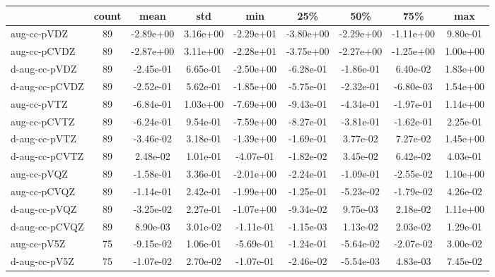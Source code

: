 \begin{tabular}{lSSSSSSSS}
\toprule
{} & {count} & {mean} & {std} & {min} & {25\%} & {50\%} & {75\%} & {max} \\
\midrule
aug-cc-pVDZ & 89 & -2.89e+00 & 3.16e+00 & -2.29e+01 & -3.80e+00 & -2.29e+00 & -1.11e+00 & 9.80e-01 \\
aug-cc-pCVDZ & 89 & -2.87e+00 & 3.11e+00 & -2.28e+01 & -3.75e+00 & -2.27e+00 & -1.25e+00 & 1.00e+00 \\
d-aug-cc-pVDZ & 89 & -2.45e-01 & 6.65e-01 & -2.50e+00 & -6.28e-01 & -1.86e-01 & 6.40e-02 & 1.83e+00 \\
d-aug-cc-pCVDZ & 89 & -2.52e-01 & 5.62e-01 & -1.85e+00 & -5.75e-01 & -2.32e-01 & -6.80e-03 & 1.54e+00 \\
aug-cc-pVTZ & 89 & -6.84e-01 & 1.03e+00 & -7.69e+00 & -9.43e-01 & -4.34e-01 & -1.97e-01 & 1.14e+00 \\
aug-cc-pCVTZ & 89 & -6.24e-01 & 9.54e-01 & -7.59e+00 & -8.27e-01 & -3.81e-01 & -1.62e-01 & 2.25e-01 \\
d-aug-cc-pVTZ & 89 & -3.46e-02 & 3.18e-01 & -1.39e+00 & -1.69e-01 & 3.77e-02 & 7.27e-02 & 1.45e+00 \\
d-aug-cc-pCVTZ & 89 & 2.48e-02 & 1.01e-01 & -4.07e-01 & -1.82e-02 & 3.45e-02 & 6.42e-02 & 4.03e-01 \\
aug-cc-pVQZ & 89 & -1.58e-01 & 3.36e-01 & -2.01e+00 & -2.24e-01 & -1.09e-01 & -2.55e-02 & 1.10e+00 \\
aug-cc-pCVQZ & 89 & -1.14e-01 & 2.42e-01 & -1.99e+00 & -1.25e-01 & -5.23e-02 & -1.79e-02 & 4.26e-02 \\
d-aug-cc-pVQZ & 89 & -3.25e-02 & 2.27e-01 & -1.07e+00 & -9.34e-02 & 9.75e-03 & 2.18e-02 & 1.11e+00 \\
d-aug-cc-pCVQZ & 89 & 8.90e-03 & 3.01e-02 & -1.11e-01 & -1.15e-03 & 1.13e-02 & 2.03e-02 & 1.29e-01 \\
aug-cc-pV5Z & 75 & -9.15e-02 & 1.06e-01 & -5.69e-01 & -1.24e-01 & -5.64e-02 & -2.07e-02 & 3.00e-02 \\
d-aug-cc-pV5Z & 75 & -1.07e-02 & 2.70e-02 & -1.07e-01 & -2.46e-02 & -5.54e-03 & 4.83e-03 & 7.45e-02 \\
\bottomrule
\end{tabular}
